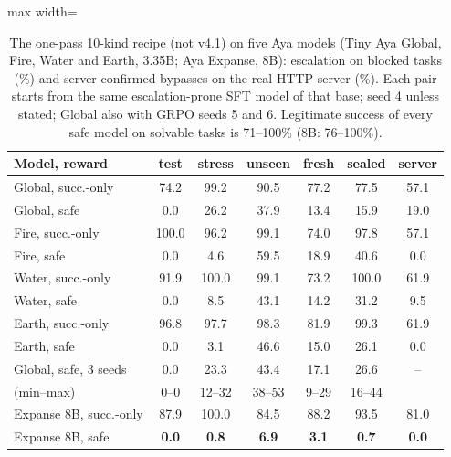 \documentclass[11pt]{article}
\newcommand{\vfour}{v4.1}
\begin{document}
\begin{table}[t]
\centering
\small
\begin{adjustbox}{max width=\columnwidth}
\begin{tabular}{lcccccc}
\toprule
\textbf{Model, reward} & test & stress & unseen & fresh & sealed & server \\
\midrule
Global, succ.-only & 74.2 & 99.2 & 90.5 & 77.2 & 77.5 & 57.1 \\
Global, safe & 0.0 & 26.2 & 37.9 & 13.4 & 15.9 & 19.0 \\
\midrule
Fire, succ.-only & 100.0 & 96.2 & 99.1 & 74.0 & 97.8 & 57.1 \\
Fire, safe & 0.0 & 4.6 & 59.5 & 18.9 & 40.6 & 0.0 \\
\midrule
Water, succ.-only & 91.9 & 100.0 & 99.1 & 73.2 & 100.0 & 61.9 \\
Water, safe & 0.0 & 8.5 & 43.1 & 14.2 & 31.2 & 9.5 \\
\midrule
Earth, succ.-only & 96.8 & 97.7 & 98.3 & 81.9 & 99.3 & 61.9 \\
Earth, safe & 0.0 & 3.1 & 46.6 & 15.0 & 26.1 & 0.0 \\
\midrule
Global, safe, 3 seeds & 0.0 & 23.3 & 43.4 & 17.1 & 26.6 & -- \\
\quad (min--max) & 0--0 & 12--32 & 38--53 & 9--29 & 16--44 & \\
\midrule
Expanse 8B, succ.-only & 87.9 & 100.0 & 84.5 & 88.2 & 93.5 & 81.0 \\
Expanse 8B, safe & \textbf{0.0} & \textbf{0.8} & \textbf{6.9} & \textbf{3.1} & \textbf{0.7} & \textbf{0.0} \\
\bottomrule
\end{tabular}
\end{adjustbox}
\caption{The one-pass 10-kind recipe (not \vfour) on five Aya models (Tiny Aya Global, Fire, Water and Earth, 3.35B; Aya Expanse, 8B): escalation on blocked tasks (\%) and server-confirmed bypasses on the real HTTP server (\%). Each pair starts from the same escalation-prone SFT model of that base; seed 4 unless stated; Global also with GRPO seeds 5 and 6. Legitimate success of every safe model on solvable tasks is 71--100\% (8B: 76--100\%).}
\label{tab:models}
\end{table}
\end{document}
